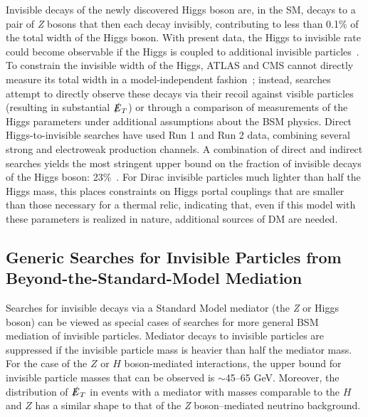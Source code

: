\documentclass{ar-1col}
\newcommand{\IP}{invisible particle}
\newcommand{\MET}{\ensuremath{\slashed{E}_T}\xspace}
\begin{document}
Invisible decays of the newly discovered Higgs boson are, in the SM,
decays to a pair of \textit{Z} bosons that then each decay invisibly,
contributing to less than 0.1\% of the total width of the Higgs boson. 
With present data, the Higgs to invisible rate could become observable
if the Higgs is coupled to additional
{\IP}s~\cite{Khachatryan:2016vau,Aad:2015pla}. To constrain the
invisible width of the Higgs, ATLAS and CMS cannot directly
measure its total width in a model-independent
fashion~\cite{Dobrescu:2012td}; instead, searches attempt to
directly observe these decays via their recoil against visible
particles (resulting in substantial \MET) or through a comparison of measurements of the
Higgs parameters under additional assumptions about the BSM
physics. Direct Higgs-to-invisible searches have used Run 1 and
Run 2 data, combining several strong and electroweak production
channels. A combination of direct and indirect searches yields the most
stringent upper bound on the fraction of invisible decays of the Higgs
boson: 23\%~\cite{Khachatryan:2016whc,Aad:2015pla}. 
For Dirac {\IP}s much lighter than half the Higgs mass, 
this places constraints on Higgs portal couplings that are smaller than those necessary for a thermal relic, 
indicating that, even if this model with these parameters is realized in nature, 
additional sources of DM are needed. 

\subsection{Generic Searches for Invisible Particles from Beyond-the-Standard-Model Mediation}\label{sec:results_monoXSearches}

Searches for invisible decays via a Standard Model mediator (the \textit{Z} or Higgs boson)
can be viewed as special cases of searches for more general BSM
mediation of {\IP}s. Mediator decays to {\IP}s are
suppressed if the {\IP} mass is heavier than half the mediator mass.
For the case of the $Z$ or $H$ boson-mediated interactions, the upper
bound for {\IP} masses that can be observed is $\sim$45--65 GeV. 
Moreover, the distribution of \MET in events with a mediator with masses comparable 
to the $H$ and $Z$ has a similar shape to that of
the \textit{Z} boson--mediated neutrino background.
\end{document}
